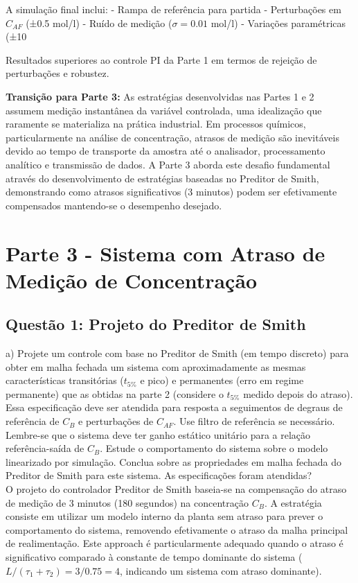 \documentclass[a4paper,12pt]{article}
\begin{document}
A simulação final inclui:
- Rampa de referência para partida
- Perturbações em $C_{AF}$ (±0.5 mol/l)
- Ruído de medição ($\sigma = 0.01$ mol/l)
- Variações paramétricas (±10%

Resultados superiores ao controle PI da Parte 1 em termos de rejeição de perturbações e robustez.

\textbf{Transição para Parte 3:} As estratégias desenvolvidas nas Partes 1 e 2 assumem medição instantânea da variável controlada, uma idealização que raramente se materializa na prática industrial. Em processos químicos, particularmente na análise de concentração, atrasos de medição são inevitáveis devido ao tempo de transporte da amostra até o analisador, processamento analítico e transmissão de dados. A Parte 3 aborda este desafio fundamental através do desenvolvimento de estratégias baseadas no Preditor de Smith, demonstrando como atrasos significativos (3 minutos) podem ser efetivamente compensados mantendo-se o desempenho desejado.

\newpage

\section{Parte 3 - Sistema com Atraso de Medição de Concentração}

\subsection{Questão 1: Projeto do Preditor de Smith}

a) Projete um controle com base no Preditor de Smith (em tempo discreto) para obter em malha fechada um sistema com aproximadamente as mesmas características transitórias (\(t_{5\%}\) e pico) e permanentes (erro em regime permanente) que as obtidas na parte 2 (considere o \(t_{5\%}\) medido depois do atraso). Essa especificação deve ser atendida para resposta a seguimentos de degraus de referência de \(C_B\) e perturbações de \(C_{AF}\). Use filtro de referência se necessário. Lembre-se que o sistema deve ter ganho estático unitário para a relação referência-saída de \(C_B\). Estude o comportamento do sistema sobre o modelo linearizado por simulação. Conclua sobre as propriedades em malha fechada do Preditor de Smith para este sistema. As especificações foram atendidas?\\

O projeto do controlador Preditor de Smith baseia-se na compensação do atraso de medição de 3 minutos (180 segundos) na concentração $C_B$. A estratégia consiste em utilizar um modelo interno da planta sem atraso para prever o comportamento do sistema, removendo efetivamente o atraso da malha principal de realimentação. Este approach é particularmente adequado quando o atraso é significativo comparado à constante de tempo dominante do sistema ($L/(\tau_1 + \tau_2) = 3/0.75 = 4$, indicando um sistema com atraso dominante).
\end{document}
